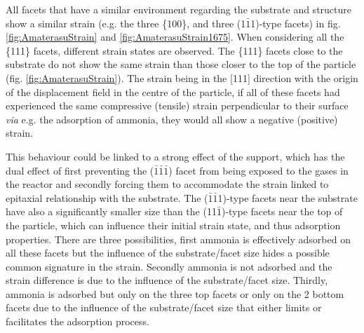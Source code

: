 All facets that have a similar environment regarding the substrate and structure show a similar strain (e.g. the three \{100\}, and three (1$\bar{1}$1)-type facets) in fig. \ref{fig:AmaterasuStrain} and \ref{fig:AmaterasuStrain1675}.
When considering all the \{111\} facets, different strain states are observed.
The \{111\} facets close to the substrate do not show the same strain than those closer to the top of the particle (fig. \ref{fig:AmaterasuStrain}).
The strain being in the [111] direction with the origin of the displacement field in the centre of the particle, if all of these facets had experienced the same compressive (tensile) strain perpendicular to their surface \textit{via} e.g. the adsorption of ammonia, they would all show a negative (positive) strain.

This behaviour could be linked to a strong effect of the support, which has the dual effect of first preventing the ($\bar{1}\bar{1}\bar{1}$) facet from being exposed to the gases in the reactor and secondly forcing them to accommodate the strain linked to epitaxial relationship with the substrate.
The ($\bar{1}\bar{1}$1)-type facets near the substrate have also a significantly smaller size than the (11$\bar{1}$)-type facets near the top of the particle, which can influence their initial strain state, and thus adsorption properties.
There are three possibilities, first ammonia is effectively adsorbed on all these facets but the influence of the substrate/facet size hides a possible common signature in the strain.
Secondly ammonia is not adsorbed and the strain difference is due to the influence of the substrate/facet size.
Thirdly, ammonia is adsorbed but only on the three top facets or only on the 2 bottom facets due to the influence of the substrate/facet size that either limits or facilitates the adsorption process.



